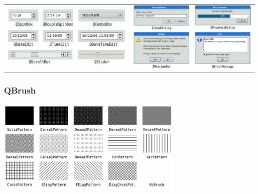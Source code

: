 \begin{tabular}{c c}
	\includegraphics[width=9cm]{images/button_6.png}&
	\includegraphics[width=9cm]{images/button_8.png}\\
\end{tabular}
\subsubsection{QBrush}
\includegraphics[width=9cm]{images/brush.png}

